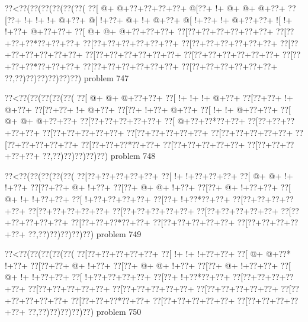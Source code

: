 \vbox{\vbox{\goo
\0??<\0??(\0??(\0??(\0??(\0??(\0??(
\0??[\- @+\- @+\0??+\0??+\0??+\0??+
\- @[\0??+\- !+\- @+\- @+\- @+\0??+
\0??[\0??+\- !+\- !+\- !+\- @+\0??+
\- @[\- !+\0??+\- @+\- !+\- @+\0??+
\- @[\- !+\0??+\- !+\- @+\0??+\0??+
\- ![\- !+\- !+\0??+\- @+\0??+\0??+
\0??[\- @+\- @+\- @+\0??+\0??+\0??+
\0??[\0??+\0??+\0??+\0??+\0??+\0??+
\0??[\0??+\0??+\0??*\0??+\0??+\0??+
\0??[\0??+\0??+\0??+\0??+\0??+\0??+
\0??[\0??+\0??+\0??+\0??+\0??+\0??+
\0??[\0??+\0??+\0??+\0??+\0??+\0??+
\0??[\0??+\0??+\0??+\0??+\0??+\0??+
\0??[\0??+\0??+\0??+\0??+\0??+\0??+
\0??[\0??+\0??+\0??*\0??+\0??+\0??+
\0??[\0??+\0??+\0??+\0??+\0??+\0??+
\0??[\0??+\0??+\0??+\0??+\0??+\0??+
\0??,\0??)\0??)\0??)\0??)\0??)\0??)
}
\hfil problem 747\hfil\break
}

\vbox{\vbox{\goo
\0??<\0??(\0??(\0??(\0??(\0??(
\0??[\- @+\- @+\- @+\0??+\0??+
\0??[\- !+\- !+\- !+\- @+\0??+
\0??[\0??+\0??+\- !+\- @+\0??+
\0??[\0??+\0??+\- !+\- @+\0??+
\0??[\0??+\- !+\0??+\- @+\0??+
\0??[\- !+\- !+\- @+\0??+\0??+
\0??[\- @+\- @+\- @+\0??+\0??+
\0??[\0??+\0??+\0??+\0??+\0??+
\0??[\- @+\0??+\0??*\0??+\0??+
\0??[\0??+\0??+\0??+\0??+\0??+
\0??[\0??+\0??+\0??+\0??+\0??+
\0??[\0??+\0??+\0??+\0??+\0??+
\0??[\0??+\0??+\0??+\0??+\0??+
\0??[\0??+\0??+\0??+\0??+\0??+
\0??[\0??+\0??+\0??*\0??+\0??+
\0??[\0??+\0??+\0??+\0??+\0??+
\0??[\0??+\0??+\0??+\0??+\0??+
\0??,\0??)\0??)\0??)\0??)\0??)
}
\hfil problem 748\hfil\break
}

\vbox{\vbox{\goo
\0??<\0??(\0??(\0??(\0??(\0??(
\0??[\0??+\0??+\0??+\0??+\0??+
\0??[\- !+\- !+\0??+\0??+\0??+
\0??[\- @+\- @+\- !+\- !+\0??+
\0??[\0??+\0??+\- @+\- !+\0??+
\0??[\0??+\- @+\- @+\- !+\0??+
\0??[\0??+\- @+\- !+\0??+\0??+
\0??[\- @+\- !+\- !+\0??+\0??+
\0??[\- !+\0??+\0??+\0??+\0??+
\0??[\0??+\- !+\0??*\0??+\0??+
\0??[\0??+\0??+\0??+\0??+\0??+
\0??[\0??+\0??+\0??+\0??+\0??+
\0??[\0??+\0??+\0??+\0??+\0??+
\0??[\0??+\0??+\0??+\0??+\0??+
\0??[\0??+\0??+\0??+\0??+\0??+
\0??[\0??+\0??+\0??*\0??+\0??+
\0??[\0??+\0??+\0??+\0??+\0??+
\0??[\0??+\0??+\0??+\0??+\0??+
\0??,\0??)\0??)\0??)\0??)\0??)
}
\hfil problem 749\hfil\break
}

\vbox{\vbox{\goo
\0??<\0??(\0??(\0??(\0??(\0??(
\0??[\0??+\0??+\0??+\0??+\0??+
\0??[\- !+\- !+\- !+\0??+\0??+
\0??[\- @+\- @+\0??*\- !+\0??+
\0??[\0??+\0??+\- @+\- !+\0??+
\0??[\0??+\- @+\- @+\- !+\0??+
\0??[\0??+\- @+\- !+\0??+\0??+
\0??[\- @+\- !+\- !+\0??+\0??+
\0??[\- !+\0??+\0??+\0??+\0??+
\0??[\0??+\- !+\0??*\0??+\0??+
\0??[\0??+\0??+\0??+\0??+\0??+
\0??[\0??+\0??+\0??+\0??+\0??+
\0??[\0??+\0??+\0??+\0??+\0??+
\0??[\0??+\0??+\0??+\0??+\0??+
\0??[\0??+\0??+\0??+\0??+\0??+
\0??[\0??+\0??+\0??*\0??+\0??+
\0??[\0??+\0??+\0??+\0??+\0??+
\0??[\0??+\0??+\0??+\0??+\0??+
\0??,\0??)\0??)\0??)\0??)\0??)
}
\hfil problem 750\hfil\break
}


